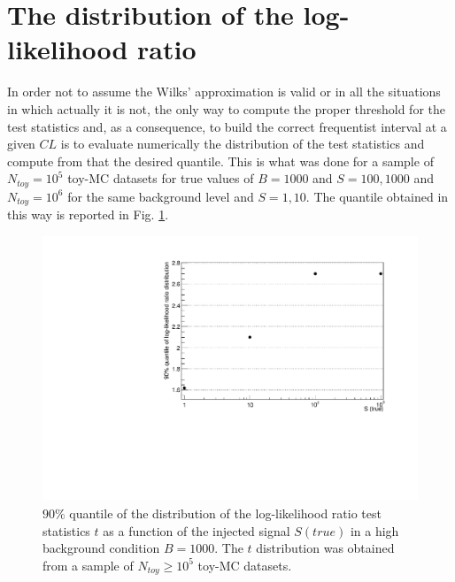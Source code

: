 \documentclass[10pt, oneside]{article}   	%
\begin{document}
\section{The distribution of the log-likelihood ratio}
In order not to assume the Wilks' approximation is valid or in all the situations in which actually it is not, the only way to compute the proper threshold for the test statistics and, as a consequence, to build the correct frequentist interval at a given $CL$ is to evaluate numerically the distribution of the test statistics and compute from that the desired quantile.
This is what was done for a sample of $N_{toy} = 10^5$ toy-MC datasets for true values of $B = 1000$ and $S = 100, 1000$ and $N_{toy} =10^6$ for the same background level and $S = 1, 10$. The quantile obtained in this way is reported in Fig. \ref{fig:threshold_b1000}.
\begin{figure}[h]
    \centering
    \includegraphics[width=\textwidth]{Ex2_threshold.pdf}
    \caption{$90\%$ quantile of the distribution of the log-likelihood ratio test statistics $t$ as a function of the injected signal $S (true)$ in a high background condition $B = 1000$. The $t$ distribution was obtained from a sample of $N_{toy} \geq 10^5$ toy-MC datasets.}
    \label{fig:threshold_b1000}
\end{figure}
\end{document}
